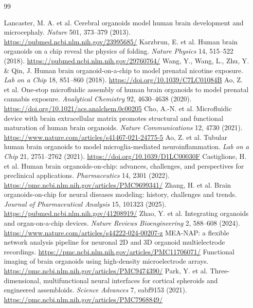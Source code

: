 \documentclass[10pt,twocolumn]{article}
\begin{document}
\begin{thebibliography}{99}\small

 Lancaster, M. A. et al. Cerebral organoids model human brain development and microcephaly. \emph{Nature} 501, 373--379 (2013). \url{https://pubmed.ncbi.nlm.nih.gov/23995685/}
 Karzbrun, E. et al. Human brain organoids on a chip reveal the physics of folding. \emph{Nature Physics} 14, 515--522 (2018). \url{https://pubmed.ncbi.nlm.nih.gov/29760764/}
 Wang, Y., Wang, L., Zhu, Y. \& Qin, J. Human brain organoid-on-a-chip to model prenatal nicotine exposure. \emph{Lab on a Chip} 18, 851--860 (2018). \url{https://doi.org/10.1039/C7LC01084B}
 Ao, Z. et al. One-stop microfluidic assembly of human brain organoids to model prenatal cannabis exposure. \emph{Analytical Chemistry} 92, 4630--4638 (2020). \url{https://doi.org/10.1021/acs.analchem.0c00205}
 Cho, A.-N. et al. Microfluidic device with brain extracellular matrix promotes structural and functional maturation of human brain organoids. \emph{Nature Communications} 12, 4730 (2021). \url{https://www.nature.com/articles/s41467-021-24775-5}
 Ao, Z. et al. Tubular human brain organoids to model microglia-mediated neuroinflammation. \emph{Lab on a Chip} 21, 2751--2762 (2021). \url{https://doi.org/10.1039/D1LC00030F}
 Castiglione, H. et al. Human brain organoids-on-chip: advances, challenges, and perspectives for preclinical applications. \emph{Pharmaceutics} 14, 2301 (2022). \url{https://pmc.ncbi.nlm.nih.gov/articles/PMC9699341/}
 Zhang, H. et al. Brain organoids-on-chip for neural diseases modeling: history, challenges and trends. \emph{Journal of Pharmaceutical Analysis} 15, 101323 (2025). \url{https://pubmed.ncbi.nlm.nih.gov/41208919/}
 Zhao, Y. et al. Integrating organoids and organ-on-a-chip devices. \emph{Nature Reviews Bioengineering} 2, 588--608 (2024). \url{https://www.nature.com/articles/s44222-024-00207-z}
 MEA-NAP: a flexible network analysis pipeline for neuronal 2D and 3D organoid multielectrode recordings. \url{https://pmc.ncbi.nlm.nih.gov/articles/PMC11706071/}
 Functional imaging of brain organoids using high-density microelectrode arrays. \url{https://pmc.ncbi.nlm.nih.gov/articles/PMC9474390/}
 Park, Y. et al. Three-dimensional, multifunctional neural interfaces for cortical spheroids and engineered assembloids. \emph{Science Advances} 7, eabf9153 (2021). \url{https://pmc.ncbi.nlm.nih.gov/articles/PMC7968849/}

\end{thebibliography}
\end{document}

